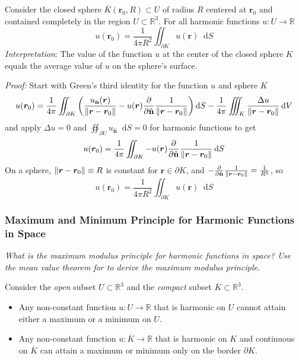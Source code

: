 \documentclass[11pt, a4paper]{article}
\newcommand{\question}[1]{\textit{#1}\vspace{2mm}}
\newcommand{\R}{\mathbb{R}} %
\newcommand{\diff}{\mathop{}\!\mathrm{d}} %
\newcommand{\nhat}{\hat{\mathbf{n}}} %
\begin{document}
Consider the closed sphere $ \overline{K}(\bm{r}_0, R) \subset U $ of radius $ R $ centered at $ \bm{r}_{0} $ and contained completely in the region $ U \subset \R^{3} $. For all harmonic functions $ u: U \to \R $
\begin{equation*}
	u(\bm{r}_0) = \frac{1}{4\pi R^2} \iint_{\partial K} u(\bm{r}) \diff S
\end{equation*}
\textit{Interpretation}: The value of the function $ u $ at the center of the closed sphere $ K $ equals the average value of $ u $ on the sphere's surface.

\vspace{2mm}
\textit{Proof:} Start with Green's third identity for the function $ u $ and sphere $ K $
\begin{equation*}
	u(\bm{r}_0) = \frac{1}{4\pi} \iint_{\partial K}\left(\frac{u_{\nhat}(\bm{r})}{\norm{\bm{r} - \bm{r}_0}} - u(\bm{r}) \pdv{}{\nhat}\frac{1}{\norm{\bm{r} - \bm{r}_0}}  \right) \diff S - \frac{1}{4\pi} \iiint_K \frac{\Delta u}{\norm{\bm{r} - \bm{r}_0}} \diff V
\end{equation*}
and apply $ \Delta u = 0 $ and $ \oiint_{\partial U} u_{\nhat} \diff S  = 0 $ for harmonic functions to get
\begin{equation*}
	u(\bm{r}_0) = \frac{1}{4\pi} \iint_{\partial K} - u(\bm{r}) \pdv{}{\nhat}\frac{1}{\norm{\bm{r} - \bm{r}_0}}   \diff S 
\end{equation*}
On a sphere, $ \norm{\bm{r} - \bm{r}_{0}} \equiv R$ is constant for $ \bm{r} \in \partial K $, and $ -\pdv{}{\nhat}\frac{1}{\norm{\bm{r} - \bm{r}_0}}  = \frac{1}{R^{2}} $, so 
\begin{equation*}
	u(\bm{r}_0) = \frac{1}{4\pi R^{2}} \iint_{\partial K} u(\bm{r}) \diff S 
\end{equation*}

\subsubsection{Maximum and Minimum Principle for Harmonic Functions in Space}
\question{What is the maximum modulus principle for harmonic functions in space? Use the mean value theorem for to derive the maximum modulus principle.}

Consider the \textit{open} subset $ U \subset \R^{3} $ and the \textit{compact} subset $ \overline{K} \subset \R^3 $.
\begin{itemize}
	\item Any non-constant function $ u : U \to \R $ that is harmonic on $ U $ cannot attain either a maximum or a minimum on $ U $. 

	\item Any non-constant function $ u : \overline{K} \to \R $ that is harmonic on $ K $ and continuous on $ \overline{K} $ can attain a maximum or minimum only on the border $ \partial K $. 
\end{itemize}
\end{document}
